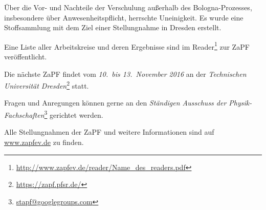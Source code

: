 Über die Vor- und Nachteile der Verschulung außerhalb des Bologna-Prozesses, insbesondere über Anwesenheitspflicht, herrschte Uneinigkeit. Es wurde eine Stoffsammlung mit dem Ziel einer Stellungnahme in Dresden erstellt.

Eine Liste aller Arbeitskreise und deren Ergebnisse sind im
Reader\footnote{\href{http://www.zapfev.de/reader/Name_des_readers.pdf}{\url{http://www.zapfev.de/reader/Name_des_readers.pdf}}}
zur ZaPF veröffentlicht.

\vfill

Die nächste ZaPF findet vom \emph{10.\ bis 13.\ November 2016} an der  \emph{Technischen Universität Dresden}\footnote{\href{https://zapf.pfsr.de/}{\url{https://zapf.pfsr.de/}}} statt.

Fragen und Anregungen können gerne an den \emph{Ständigen Ausschuss der Physik-Fachschaften}\footnote{\href{mailto:stapf@googlegroups.com}{\url{stapf@googlegroups.com}}} gerichtet werden.

Alle Stellungnahmen der ZaPF und weitere Informationen sind auf \href{http://www.zapfev.de}{\url{www.zapfev.de}} zu finden.

